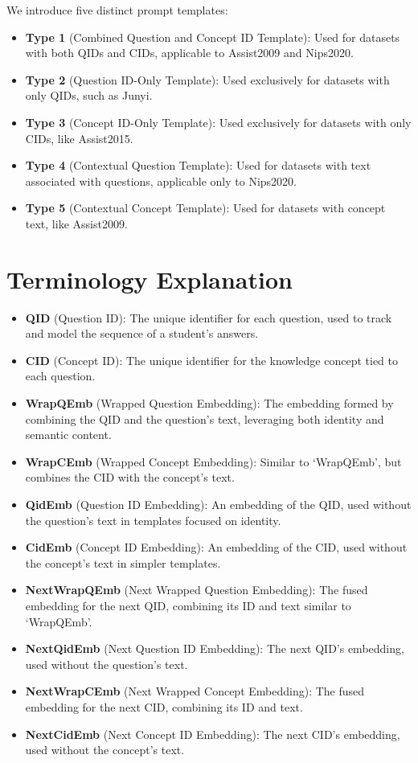 We introduce five distinct prompt templates:
\begin{itemize}
    \item \textbf{Type 1} (Combined Question and Concept ID Template): Used for datasets with both QIDs and CIDs, applicable to Assist2009 and Nips2020.
    \item \textbf{Type 2} (Question ID-Only Template): Used exclusively for datasets with only QIDs, such as Junyi.
    \item \textbf{Type 3} (Concept ID-Only Template): Used exclusively for datasets with only CIDs, like Assist2015.
    \item \textbf{Type 4} (Contextual Question Template): Used for datasets with text associated with questions, applicable only to Nips2020.
    \item \textbf{Type 5} (Contextual Concept Template): Used for datasets with concept text, like Assist2009.
\end{itemize}


\section{Terminology Explanation}

\begin{itemize}
    \item \textbf{QID} (Question ID): The unique identifier for each question, used to track and model the sequence of a student’s answers. 
    \item \textbf{CID} (Concept ID): The unique identifier for the knowledge concept tied to each question.
    \item \textbf{WrapQEmb} (Wrapped Question Embedding): The embedding formed by combining the QID and the question’s text, leveraging both identity and semantic content.
    \item \textbf{WrapCEmb} (Wrapped Concept Embedding): Similar to ‘WrapQEmb’, but combines the CID with the concept’s text.
    \item \textbf{QidEmb} (Question ID Embedding): An embedding of the QID, used without the question’s text in templates focused on identity.
    \item \textbf{CidEmb} (Concept ID Embedding): An embedding of the CID, used without the concept’s text in simpler templates.
    \item \textbf{NextWrapQEmb} (Next Wrapped Question Embedding): The fused embedding for the next QID, combining its ID and text similar to ‘WrapQEmb’.
    \item \textbf{NextQidEmb} (Next Question ID Embedding): The next QID’s embedding, used without the question’s text.
    \item \textbf{NextWrapCEmb} (Next Wrapped Concept Embedding): The fused embedding for the next CID, combining its ID and text.
    \item \textbf{NextCidEmb} (Next Concept ID Embedding): The next CID’s embedding, used without the concept’s text.
\end{itemize}

